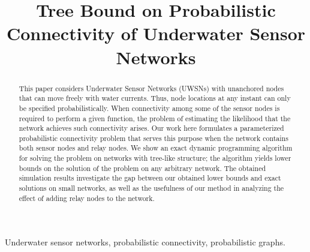 \documentclass[letterpaper,conference,fleqn]{IEEEtran}
\begin{document}
\newcommand {\nwline} {\hfill\break}
%
%
\title {
       Tree Bound on Probabilistic Connectivity of Underwater Sensor Networks
}
\author {
	\and
}
\maketitle
\thispagestyle{empty}
%
\begin{abstract}
This paper considers Underwater Sensor Networks (UWSNs) with unanchored
nodes that can move freely with water currents.
%
Thus, node locations at any instant can only be specified probabilistically.
%
When connectivity among some of the sensor nodes is required to perform
a given function, the problem of estimating the likelihood that the network
achieves such connectivity arises.
%
Our work here formulates a parameterized probabilistic connectivity
problem that serves this purpose when the network contains both sensor nodes
and relay nodes.
%
We show an exact dynamic programming algorithm for solving the problem
on networks with tree-like structure; 
the algorithm yields lower bounds on the solution of
the problem on any arbitrary network.
%
The obtained simulation results investigate the gap between our obtained
lower bounds and exact solutions on small networks, as well as
the usefulness of our method in analyzing the effect of adding relay nodes
to the network.
\end{abstract}
%
\ifdefined\OmitProof
%
\else
\nwline
\begin{IEEEkeywords}
Underwater sensor networks,
probabilistic connectivity,
probabilistic graphs.
\end{IEEEkeywords}
\fi
\end{document}
